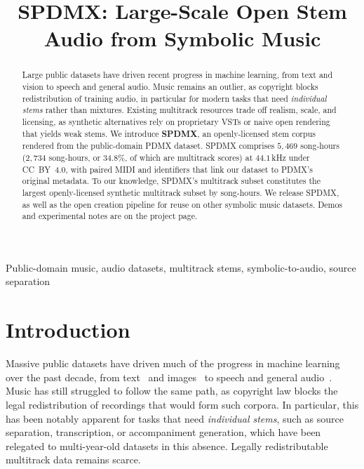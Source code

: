 \documentclass{article}
\title{SPDMX: Large-Scale Open Stem Audio from Symbolic Music}
\newcommand{\demourl}{https://pnlong.github.io/SPDMX/}
\begin{document}
\maketitle

\begin{abstract}
Large public datasets have driven recent progress in machine learning, from text and vision to speech and general audio.
Music remains an outlier, as copyright blocks redistribution of training audio, in particular for modern tasks that need \emph{individual stems} rather than mixtures.
Existing multitrack resources trade off realism, scale, and licensing, as synthetic alternatives rely on proprietary VSTs or naive open rendering that yields weak stems.
We introduce \textbf{SPDMX}, an openly-licensed stem corpus rendered from the public-domain PDMX dataset. SPDMX comprises $5{,}469$ song-hours ($2{,}734$ song-hours, or $34.8\%$, of which are multitrack scores) at $44.1$\,kHz under CC~BY~4.0, with paired MIDI and identifiers that link our dataset to PDMX's original metadata.
To our knowledge, SPDMX's multitrack subset constitutes the largest openly-licensed synthetic multitrack subset by song-hours.
We release SPDMX, as well as the open creation pipeline for reuse on other symbolic music datasets.
Demos and experimental notes are on the project page.\footnotemark[1]
\end{abstract}
\footnotetext[1]{\url{\demourl}}

\begin{keywords}
Public-domain music, audio datasets, multitrack stems, symbolic-to-audio,
source separation
\end{keywords}

\vspace{-1em}

\section{Introduction}
\label{sec:intro}

Massive public datasets have driven much of the progress in machine learning over the past decade, from text~\cite{raffel2020exploring,gao2020pile} and images~\cite{deng2009imagenet,schuhmann2022laion} to speech and general audio~\cite{gemmeke2017audio,panayotov2015librispeech}.
Music has still struggled to follow the same path, as copyright law blocks the legal redistribution of recordings that would form such corpora.
In particular, this has been notably apparent for tasks that need \emph{individual stems}, such as source separation, transcription, or accompaniment generation, which have been relegated to multi-year-old datasets in this absence.
Legally redistributable multitrack data remains scarce.
\end{document}
